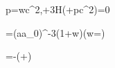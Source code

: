 p=w\rho c^2,\qquad \dot\rho+3H\left(\rho+\frac p{c^2}\right)=0

=\left(\frac a{a_0}\right)^{-3(1+w)}\quad(w=)

=-\left(\rho+\right)

